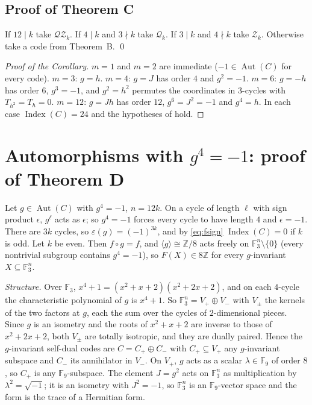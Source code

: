 \documentclass[11pt]{amsart}
\theoremstyle{definition}
\newcommand{\F}{\mathbb{F}_3}
\newcommand{\Z}{\mathbb{Z}}
\newcommand{\Index}{\operatorname{Index}}
\newcommand{\Aut}{\operatorname{Aut}}
\begin{document}
\subsection{Proof of Theorem C}
If $12\mid k$ take $\mathcal{QZ}_k$. If $4\mid k$ and $3\nmid k$ take $\mathcal Q_k$. If $3\mid k$ and
$4\nmid k$ take $\mathcal Z_k$. Otherwise take a code from Theorem~B. \qed

\begin{proof}[Proof of the Corollary]
$m=1$ and $m=2$ are immediate ($-1\in\Aut(C)$ for every code). $m=3$: $g=h$. $m=4$: $g=J$ has order
$4$ and $g^2=-1$. $m=6$: $g=-h$ has order $6$, $g^3=-1$, and $g^2=h^2$ permutes the coordinates in
$3$-cycles with $T_{h^2}=T_h=0$. $m=12$: $g=Jh$ has order $12$, $g^6=J^2=-1$ and $g^4=h$. In each case
$\Index(C)=24$ and the hypotheses of \cite[Thm.~5.6]{GJF} hold.
\end{proof}

\section{Automorphisms with \texorpdfstring{$g^4=-1$}{g4 = -1}: proof of Theorem D}\label{sec:obstruction}

Let $g\in\Aut(C)$ with $g^4=-1$, $n=12k$. On a cycle of length $\ell$ with sign product $\epsilon$,
$g^\ell$ acts as $\epsilon$; so $g^4=-1$ forces every cycle to have length $4$ and $\epsilon=-1$.
There are $3k$ cycles, so $\varepsilon(g)=(-1)^{3k}$, and by \eqref{eq:fsign} $\Index(C)=0$ if $k$
is odd. Let $k$ be even. Then $f\circ g=f$, and $\langle g\rangle\cong\Z/8$ acts freely on
$\F^n\setminus\{0\}$ (every nontrivial subgroup contains $g^4=-1$), so $F(X)\in8\Z$ for every
$g$-invariant $X\subseteq\F^n$.

\emph{Structure.} Over $\F$, $x^4+1=(x^2+x+2)(x^2+2x+2)$, and on each $4$-cycle the characteristic
polynomial of $g$ is $x^4+1$. So $\F^n=V_+\oplus V_-$ with $V_\pm$ the kernels of the two factors at
$g$, each the sum over the cycles of $2$-dimensional pieces. Since $g$ is an isometry and the roots of
$x^2+x+2$ are inverse to those of $x^2+2x+2$, both $V_\pm$ are totally isotropic, and they are dually
paired. Hence the $g$-invariant self-dual codes are $C=C_+\oplus C_-$ with $C_+\subseteq V_+$ any
$g$-invariant subspace and $C_-$ its annihilator in $V_-$. On $V_+$, $g$ acts as a scalar
$\lambda\in\mathbb F_9$ of order $8$, so $C_+$ is any $\mathbb F_9$-subspace. The element $J=g^2$
acts on $\F^n$ as multiplication by $\lambda^2=\sqrt{-1}$; it is an isometry with $J^2=-1$, so
$\F^n$ is an $\mathbb F_9$-vector space and the form is the trace of a Hermitian form.
\end{document}
